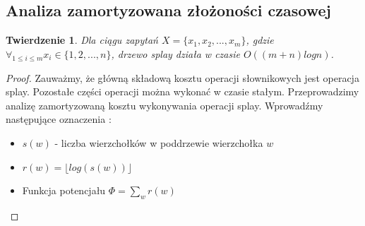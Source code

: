 \documentclass[declaration,shortabstract]{iithesis}
\newcounter{thm}[section]
\theoremstyle{thm}
\theoremstyle{remark}
\theoremstyle{plain}
\newtheorem{theorem}[thm]{Twierdzenie}
\theoremstyle{plain}
\theoremstyle{plain}
\begin{document}
\subsection{Analiza zamortyzowana złożoności czasowej} 
\begin{theorem} 
Dla ciągu zapytań $X = \{ x_1, x_2, ..., x_m\}$, gdzie \( \forall_{1\leq i \leq m} x_i \in \{1, 2,...,n\}\), drzewo splay działa w czasie \( O((m+n)logn)\). 
\end{theorem} 
\begin{proof} Zauważmy, że główną składową kosztu operacji słownikowych jest operacja splay. Pozostałe części operacji można wykonać w czasie stałym. Przeprowadzimy analizę zamortyzowaną kosztu wykonywania operacji splay. Wprowadźmy następujące oznaczenia : 
\begin{itemize} 
\item{\(s(w)\) - liczba wierzchołków w poddrzewie wierzchołka \(w\)} 
\item{\(r(w) = \lfloor log(s(w)) \rfloor\)} 
\item{Funkcja potencjału \(\Phi = \sum_w r(w)\)} 
\end{itemize}  


\end{proof}
\end{document}
